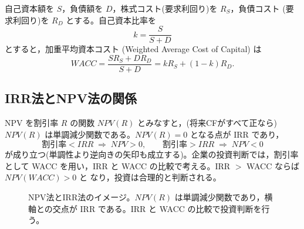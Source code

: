 \begin{definition}
自己資本額を $S$，負債額を $D$，株式コスト(要求利回り)を $R_S$，負債コスト
(要求利回り)を $R_D$ とする。自己資本比率を
\[
k = \frac{S}{S+D}
\]
とすると，加重平均資本コスト (Weighted Average Cost of Capital) は
\begin{equation}
WACC = \frac{S R_S + D R_D}{S+D} = k R_S + (1-k) R_D.
\end{equation}
\end{definition}

\vspace{18pt}

\subsection{IRR法とNPV法の関係}

NPV を割引率 $R$ の関数 $NPV(R)$ とみなすと，(将来CFがすべて正なら)
$NPV(R)$ は単調減少関数である。$NPV(R)=0$ となる点が IRR であり，
\[
\text{割引率} < IRR \;\Rightarrow\; NPV > 0,
\qquad
\text{割引率} > IRR \;\Rightarrow\; NPV < 0
\]
が成り立つ(単調性より逆向きの矢印も成立する)。企業の投資判断では，割引率として
WACC を用い，IRR と WACC の比較で考える。IRR $>$ WACC ならば $NPV(WACC)>0$ と
なり，投資は合理的と判断される。

\begin{figure}[htbp]
\centering
{}
\caption{NPV法とIRR法のイメージ。$NPV(R)$ は単調減少関数であり，横軸との交点が
IRR である。IRR と WACC の比較で投資判断を行う。}
\label{fig:npv-irr}
\end{figure}


